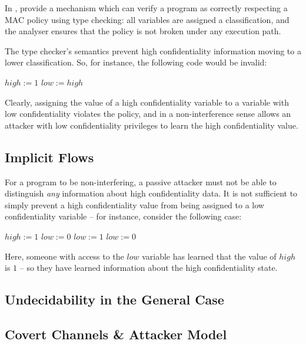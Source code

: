 In , \citeauthor{denning1977certification} \cite{denning1977certification} provide a mechanism which can verify a program as correctly respecting a MAC policy using type checking: all variables are assigned a classification, and the analyser ensures that the policy is not broken under any execution path.

The type checker's semantics prevent high confidentiality information moving to a lower classification. So, for instance, the following code would be invalid:

\begin{algorithmic}
\State $ high := 1 $
\State $ low := high $
\end{algorithmic}

Clearly, assigning the value of a high confidentiality variable to a variable with low confidentiality violates the policy, and in a non-interference sense allows an attacker with low confidentiality privileges to learn the high confidentiality value.

\subsection{Implicit Flows}

For a program to be non-interfering, a passive attacker must not be able to distinguish \textit{any} information about high confidentiality data. It is not sufficient to simply prevent a high confidentiality value from being assigned to a low confidentiality variable -- for instance, consider the following case:

\begin{algorithmic}
	\State $ high := 1 $
	\State $ low := 0 $
		\State $ low := 1 $
	\Else
		\State $ low := 0 $
	\EndIf
\end{algorithmic}

Here, someone with access to the $ low $ variable has learned that the value of $ high $ is $ 1 $ -- so they have learned information about the high confidentiality state.

\subsection{Undecidability in the General Case}

\subsection{Covert Channels \& Attacker Model}

